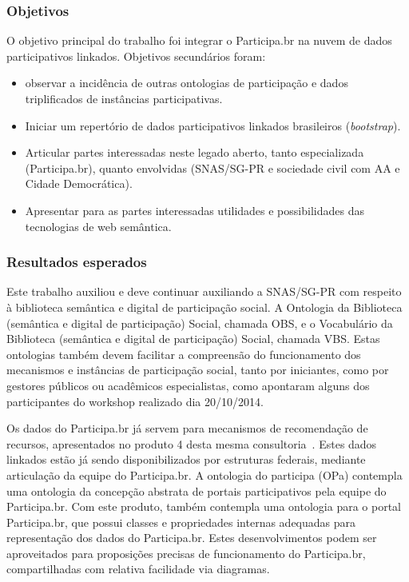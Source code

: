 \documentclass[12pt]{article}
\begin{document}
\subsubsection{Objetivos}
O objetivo principal do trabalho foi integrar o Participa.br na nuvem de dados participativos linkados. Objetivos secundários foram:
\begin{itemize}
    \item observar a incidência de outras ontologias de participação e dados triplificados de instâncias participativas.
    \item Iniciar um repertório de dados participativos linkados brasileiros (\emph{bootstrap}).
    \item Articular partes interessadas neste legado aberto, tanto especializada (Participa.br), quanto envolvidas (SNAS/SG-PR e sociedade civil com AA e Cidade Democrática).
    \item Apresentar para as partes interessadas utilidades e possibilidades das tecnologias de web semântica.
\end{itemize}

\subsubsection{Resultados esperados}
Este trabalho auxiliou e deve continuar auxiliando a SNAS/SG-PR com respeito à biblioteca semântica e digital de participação social. A Ontologia da Biblioteca (semântica e digital de participação) Social, chamada OBS, e o Vocabulário da Biblioteca (semântica e digital de participação) Social, chamada VBS. Estas ontologias também devem facilitar a compreensão do funcionamento dos mecanismos e instâncias de participação social, tanto por iniciantes, como por gestores públicos ou acadêmicos especialistas, como apontaram alguns dos participantes do workshop realizado dia 20/10/2014.

Os dados do Participa.br já servem para mecanismos de recomendação de recursos, apresentados no produto 4 desta mesma consultoria~\cite{repoProd4}. Estes dados linkados estão já sendo disponibilizados por estruturas federais, mediante articulação da equipe do Participa.br. A ontologia do participa (OPa) contempla uma ontologia da concepção abstrata de portais participativos pela equipe do Participa.br. Com este produto, também contempla uma ontologia para o portal Participa.br, que possui classes e propriedades internas adequadas para representação dos dados do Participa.br. Estes desenvolvimentos podem ser aproveitados para proposições precisas de funcionamento do Participa.br, compartilhadas com relativa facilidade via diagramas.
\end{document}

